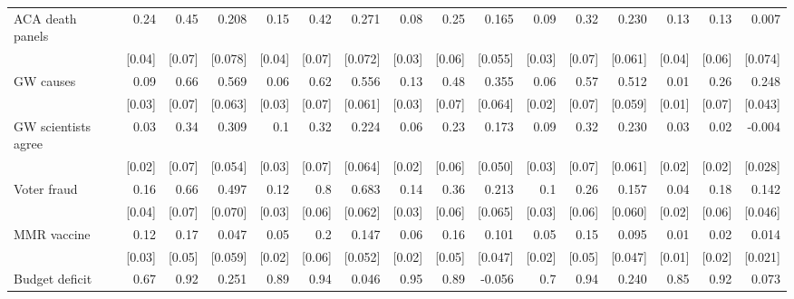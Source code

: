 \begin{table}[t]
\begin{adjustbox}{max width=\textwidth}
\begin{tabular}{l*{15}{D{.}{.}{-1}}}
			ACA death panels    & 0.24       & 0.45       & 0.208    & 0.15       & 0.42       & 0.271    & 0.08       & 0.25       & 0.165    & 0.09       & 0.32       & 0.230    & 0.13       & 0.13       & 0.007       \\
			& {[}0.04{]} & {[}0.07{]} & {[}0.078{]} & {[}0.04{]} & {[}0.07{]} & {[}0.072{]} & {[}0.03{]} & {[}0.06{]} & {[}0.055{]} & {[}0.03{]} & {[}0.07{]} & {[}0.061{]} & {[}0.04{]} & {[}0.06{]} & {[}0.074{]} \\
			GW causes           & 0.09       & 0.66       & 0.569    & 0.06       & 0.62       & 0.556    & 0.13       & 0.48       & 0.355    & 0.06       & 0.57       & 0.512    & 0.01       & 0.26       & 0.248    \\
			& {[}0.03{]} & {[}0.07{]} & {[}0.063{]} & {[}0.03{]} & {[}0.07{]} & {[}0.061{]} & {[}0.03{]} & {[}0.07{]} & {[}0.064{]} & {[}0.02{]} & {[}0.07{]} & {[}0.059{]} & {[}0.01{]} & {[}0.07{]} & {[}0.043{]} \\
			GW scientists agree & 0.03       & 0.34       & 0.309    & 0.1        & 0.32       & 0.224    & 0.06       & 0.23       & 0.173    & 0.09       & 0.32       & 0.230    & 0.03       & 0.02       & -0.004      \\
			& {[}0.02{]} & {[}0.07{]} & {[}0.054{]} & {[}0.03{]} & {[}0.07{]} & {[}0.064{]} & {[}0.02{]} & {[}0.06{]} & {[}0.050{]} & {[}0.03{]} & {[}0.07{]} & {[}0.061{]} & {[}0.02{]} & {[}0.02{]} & {[}0.028{]} \\
			Voter fraud         & 0.16       & 0.66       & 0.497    & 0.12       & 0.8        & 0.683    & 0.14       & 0.36       & 0.213    & 0.1        & 0.26       & 0.157    & 0.04       & 0.18       & 0.142    \\
			& {[}0.04{]} & {[}0.07{]} & {[}0.070{]} & {[}0.03{]} & {[}0.06{]} & {[}0.062{]} & {[}0.03{]} & {[}0.06{]} & {[}0.065{]} & {[}0.03{]} & {[}0.06{]} & {[}0.060{]} & {[}0.02{]} & {[}0.06{]} & {[}0.046{]} \\
			MMR vaccine         & 0.12       & 0.17       & 0.047       & 0.05       & 0.2        & 0.147    & 0.06       & 0.16       & 0.101     & 0.05       & 0.15       & 0.095     & 0.01       & 0.02       & 0.014       \\
			& {[}0.03{]} & {[}0.05{]} & {[}0.059{]} & {[}0.02{]} & {[}0.06{]} & {[}0.052{]} & {[}0.02{]} & {[}0.05{]} & {[}0.047{]} & {[}0.02{]} & {[}0.05{]} & {[}0.047{]} & {[}0.01{]} & {[}0.02{]} & {[}0.021{]} \\
			Budget deficit      & 0.67       & 0.92       & 0.251    & 0.89       & 0.94       & 0.046       & 0.95       & 0.89       & -0.056      & 0.7        & 0.94       & 0.240    & 0.85       & 0.92       & 0.073       \\

\end{tabular}
\end{adjustbox}
\end{table}
